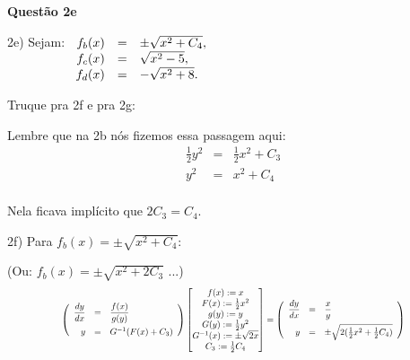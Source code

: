 \documentclass[oneside,12pt]{article}
\begin{document}
\newpage


{\bf Questão 2e}

\msk

2e) Sejam:
%
$\begin{array}[t]{rcl}
 f_b(x) &=& \pm \sqrt{x^2 + C_4}, \\
 f_c(x) &=&     \sqrt{x^2 - 5}, \\
 f_d(x) &=&  -  \sqrt{x^2 + 8}. \\
 \end{array}
$

\bsk
\bsk
\bsk

Truque pra 2f e pra 2g:

Lembre que na 2b nós fizemos essa passagem aqui:
%
$$\begin{array}{rcl}
  \frac12 y^2 &=& \frac12 x^2 + C_3 \\
          y^2 &=& x^2 + C_4 \\
  \end{array}
$$

Nela ficava implícito que $2C_3 = C_4$.


\newpage


\bsk


2f) Para $f_b(x) = \pm \sqrt{x^2 + C_4}$:

 (Ou: $f_b(x) = \pm \sqrt{x^2 + 2C_3}$ ...)
%
\def\SubstQuestaoUmTmp{
  \bmat{ f(x) := x \\
         F(x) := \frac12 x^2 \\
         g(y) := y \\
         G(y) := \frac12 y^2 \\
         G^{-1}(x) := \pm \sqrt{2x} \\
         C_3 := \frac12 C_4 \\
       }
  }
\def\EDOVSGtwoTmp{
  \left(
  \begin{array}{rcl}
  \D \frac{dy}{dx} &=& \D \frac{x}{y} \\ [10pt]
                 y &=& \pm \sqrt{2(\frac12 x^2 + \frac12 C_4)}   \\
  \end{array}
  \right)
  }
%
$$\scalebox{0.7}{$
    \EDOVSGtwo
    \SubstQuestaoUmTmp
    =
    \EDOVSGtwoTmp
  $}
$$
\end{document}
